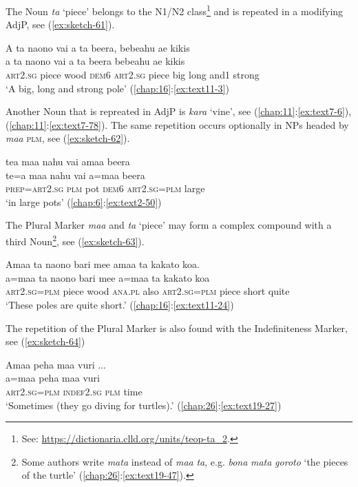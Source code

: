 \documentclass[output=paper]{langscibook}
\begin{document}
The Noun \textit{ta} `piece' belongs to the N1/N2 class\footnote{See: \url{https://dictionaria.clld.org/units/teop-ta\_2}.} and is repeated in a modifying AdjP, see (\ref{ex:sketch-61}).

\ea\label{ex:sketch-61}
    A ta naono vai a ta beera, bebeahu ae kikis\\
    \gll a	ta	naono	vai	a	ta	beera	bebeahu	ae	kikis\\
    \textsc{art}2.\textsc{sg}	piece	wood	\textsc{dem}6	\textsc{art}2.\textsc{sg}	piece	big	long	and1	strong\\
    \glt `A big, long and strong pole' (\ref{chap:16}:\ref{ex:text11-3})
\z

Another Noun that is repreated in AdjP is \textit{kara} `vine', see (\ref{chap:11}:\ref{ex:text7-6}), (\ref{chap:11}:\ref{ex:text7-78}). The same repetition occurs optionally in NPs headed by \textit{maa} \textsc{plm}, see (\ref{ex:sketch-62}).

\ea\label{ex:sketch-62}
    tea maa nahu vai amaa beera\\
    \gll te=a	maa	nahu	vai	a=maa	beera\\
    \textsc{prep}=\textsc{art}2.\textsc{sg}	\textsc{plm}	pot	\textsc{dem}6	\textsc{art}2.\textsc{sg}=\textsc{plm}	large\\
    \glt `in large pots' (\ref{chap:6}:\ref{ex:text2-50})
\z

The Plural Marker \textit{maa} and \textit{ta} `piece' may form a complex compound with a third Noun\footnote{Some authors write \textit{mata} instead of \textit{maa} \textit{ta}, e.g. \textit{bona} \textit{mata} \textit{goroto} `the pieces of the turtle' (\ref{chap:26}:\ref{ex:text19-47}).}, see (\ref{ex:sketch-63}).

\ea\label{ex:sketch-63}
    Amaa ta naono bari mee amaa ta kakato koa.\\
    \gll a=maa	ta	naono	bari	mee	a=maa	ta	kakato	koa\\
    \textsc{art}2.\textsc{sg}=\textsc{plm}	piece	wood	\textsc{ana}.\textsc{pl}	also	\textsc{art}2.\textsc{sg}=\textsc{plm}	piece	short	quite\\
    \glt `These poles are quite short.' (\ref{chap:16}:\ref{ex:text11-24})
\z


\largerpage[2]
The repetition of the Plural Marker is also found with the Indefiniteness Marker, see (\ref{ex:sketch-64})

\ea\label{ex:sketch-64}
    Amaa peha maa vuri ...\\
    \gll a=maa	peha	maa	vuri\\
    \textsc{art}2.\textsc{sg}=\textsc{plm}	\textsc{indef}2.\textsc{sg}	\textsc{plm}	time\\
    \glt `Sometimes (they go diving for turtles).' (\ref{chap:26}:\ref{ex:text19-27})
\z
\end{document}
